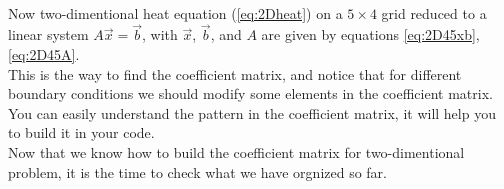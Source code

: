 \\ 
Now two-dimentional heat equation (\ref{eq:2Dheat}) on a $5 \times 4$ grid reduced to a linear system $A\vec{x}=\vec{b}$, with  $\vec{x}$, $\vec{b}$, and $A$ are given by equations \ref{eq:2D45xb}, \ref{eq:2D45A}. 
\\
This is the way to find the coefficient matrix, and notice that for different boundary conditions we should modify some elements in the coefficient matrix. You can easily understand the pattern in the coefficient matrix, it will help you to build it in your code.
\\
Now that we know how to build the coefficient matrix for two-dimentional problem, it is the time to check what we have orgnized so far. 

\pagebreak


